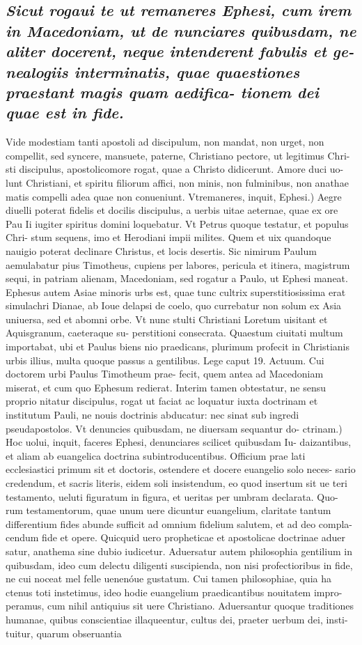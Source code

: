 \documentclass{article}
\begin{document}
\begin{pages}
\subsection*{\textit{Sicut rogaui te ut remaneres Ephesi, cum irem in Macedoniam, ut de nunciares quibusdam, ne aliter docerent, neque intenderent fabulis et ge- nealogiis interminatis, quae quaestiones praestant magis quam aedifica- tionem dei quae est in fide. }}\pstart Vide modestiam tanti apostoli ad discipulum, non mandat, non urget, non compellit, sed syncere, mansuete, paterne, Christiano pectore, ut legitimus Chri- sti discipulus, apostolicomore rogat, quae a Christo didicerunt. Amore duci uo- lunt Christiani, et spiritu filiorum affici, non minis, non fulminibus, non anathae matis compelli adea quae non conueniunt. Vtremaneres, inquit, Ephesi.) Aegre diuelli poterat fidelis et docilis discipulus, a uerbis uitae aeternae, quae ex ore Pau Ii iugiter spiritus domini loquebatur. Vt Petrus quoque testatur, et populus Chri- stum sequens, imo et Herodiani impii milites. Quem et uix quandoque nauigio poterat declinare Christus, et locis desertis. Sic nimirum Paulum aemulabatur pius Timotheus, cupiens per labores, pericula et itinera, magistrum sequi, in patriam alienam, Macedoniam, sed rogatur a Paulo, ut Ephesi maneat. Ephesus autem Asiae minoris urbs est, quae tunc cultrix superstitiosissima erat simulachri Dianae, ab Ioue delapsi de coelo, quo currebatur non solum ex Asia uniuersa, sed et abomni orbe. Vt nunc stulti Christiani Loretum uisitant et Aquisgranum, caeteraque su- perstitioni consecrata. Quaestum ciuitati multum importabat, ubi et Paulus biens nio praedicans, plurimum profecit in Christianis urbis illius, multa quoque passus a gentilibus. Lege caput 19. Actuum. Cui doctorem urbi Paulus Timotheum prae- fecit, quem antea ad Macedoniam miserat, et cum quo Ephesum redierat. Interim tamen obtestatur, ne sensu proprio nitatur discipulus, rogat ut faciat ac loquatur iuxta doctrinam et institutum Pauli, ne nouis doctrinis abducatur: nec sinat sub ingredi pseudapostolos. Vt denuncies quibusdam, ne diuersam sequantur do- ctrinam.) Hoc uolui, inquit, faceres Ephesi, denunciares scilicet quibusdam Iu- daizantibus, et aliam ab euangelica doctrina subintroducentibus. Officium prae lati ecclesiastici primum sit et doctoris, ostendere et docere euangelio solo neces- sario credendum, et sacris literis, eidem soli insistendum, eo quod insertum sit ue teri testamento, ueluti figuratum in figura, et ueritas per umbram declarata. Quo- rum testamentorum, quae unum uere dicuntur euangelium, claritate tantum differentium fides abunde sufficit ad omnium fidelium salutem, et ad deo compla- cendum fide et opere. Quicquid uero propheticae et apostolicae doctrinae aduer satur, anathema sine dubio iudicetur. Aduersatur autem philosophia gentilium in quibusdam, ideo cum delectu diligenti suscipienda, non nisi profectioribus in fide, ne cui noceat mel felle uenenóue gustatum. Cui tamen philosophiae, quia ha ctenus toti instetimus, ideo hodie euangelium praedicantibus nouitatem impro- peramus, cum nihil antiquius sit uere Christiano. Aduersantur quoque traditiones humanae, quibus conscientiae illaqueentur, cultus dei, praeter uerbum dei, insti- tuitur, quarum obseruantia 
\end{pages}
\end{document}
